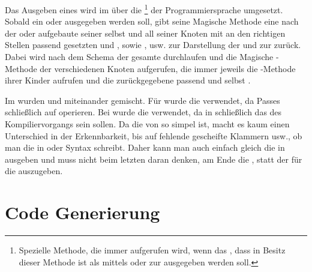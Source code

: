 Das Ausgeben eines  wird im  über die  \footnote{Spezielle Methode, die immer aufgerufen wird, wenn das , dass in Besitz dieser Methode ist als  mittels  oder zur  ausgegeben werden soll.} der Programmiersprache  umgesetzt. Sobald ein  oder  ausgegeben werden soll, gibt seine Magische Methode  eine nach der  oder  aufgebaute  seiner selbst und all seiner Knoten mit an den richtigen Stellen passend gesetzten   \smalltt{(} und  \smalltt{)} , sowie  ,  \smalltt{;} usw. zur Darstellung der  und zur  zurück. Dabei wird nach dem  Schema der gesamte  durchlaufen und die Magische -Methode der verschiedenen Knoten aufgerufen, die immer jeweils die -Methode ihrer Kinder aufrufen und die zurückgegebene  passend  und selbst .

Im  wurden  und  miteinander gemischt. Für  wurde die  verwendet, da Passes schließlich auf  operieren. Bei  wurde die  verwendet, da  in  schließlich das  des Kompiliervorgangs sein sollen. Da die  von  so simpel ist, macht es kaum einen Unterschied in der Erkennbarkeit, bis auf fehlende gescheifte Klammern \smalltt{()} usw., ob man die  in  oder  Syntax schreibt. Daher kann man auch einfach gleich die  in  ausgeben und muss nicht beim letzten  daran denken, am Ende die , statt der  für die  auszugeben.

\section{Code Generierung}
\label{sec:code_generierung}

